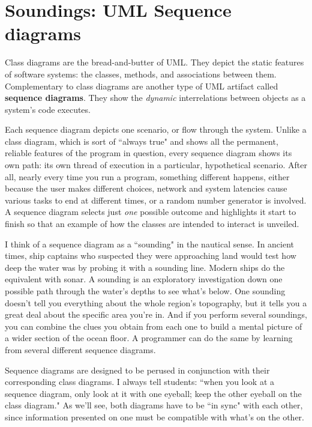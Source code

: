 
\chapter{Soundings: UML Sequence diagrams}

Class diagrams are the bread-and-butter of UML. They depict the static
features of software systems: the classes, methods, and associations between
them. Complementary to class diagrams are another type of UML artifact called
\textbf{sequence diagrams}. They show the \textit{dynamic} interrelations
between objects as a system's code executes.

Each sequence diagram depicts one scenario, or flow through the system. Unlike
a class diagram, which is sort of ``always true" and shows all the permanent,
reliable features of the program in question, every sequence diagram shows its
own path: its own thread of execution in a particular, hypothetical scenario.
After all, nearly every time you run a program, something different happens,
either because the user makes different choices, network and system latencies
cause various tasks to end at different times, or a random number generator is
involved. A sequence diagram selects just \textit{one} possible outcome and
highlights it start to finish so that an example of how the classes are
intended to interact is unveiled.

I think of a sequence diagram as a ``sounding" in the nautical sense. In
ancient times, ship captains who suspected they were approaching land would
test how deep the water was by probing it with a sounding line. Modern ships
do the equivalent with sonar. A sounding is an exploratory investigation down
one possible path through the water's depths to see what's below. One sounding
doesn't tell you everything about the whole region's topography, but it tells
you a great deal about the specific area you're in. And if you perform several
soundings, you can combine the clues you obtain from each one to build a
mental picture of a wider section of the ocean floor. A programmer can do the
same by learning from several different sequence diagrams.

Sequence diagrams are designed to be perused in conjunction with their
corresponding class diagrams. I always tell students: ``when you look at a
sequence diagram, only look at it with one eyeball; keep the other eyeball on
the class diagram." As we'll see, both diagrams have to be ``in sync" with
each other, since information presented on one must be compatible with what's
on the other.

